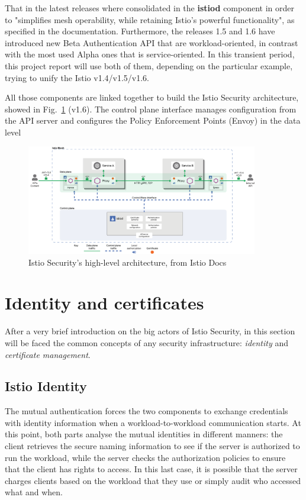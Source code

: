 That in the latest releases where consolidated in the \textbf{istiod} component in order to "simplifies mesh operability, while retaining Istio’s powerful functionality", as specified in the documentation. Furthermore, the releases 1.5 and 1.6 have introduced new Beta Authentication API that are workload-oriented, in contrast with the most used Alpha ones that is service-oriented. In this transient period, this project report will use both of them, depending on the particular example, trying to unify the Istio v1.4/v1.5/v1.6.

All those components are linked together to build the Istio Security architecture, showed in Fig.~\ref{fig:hlarch} (v1.6). The control plane interface manages configuration from the API server and configures the Policy Enforcement Points (Envoy) in the data level

\begin{figure}
    \centering
    \includegraphics[width=0.9\textwidth]{chapters/images/chp1/arch-sec.png}
    \caption{Istio Security's high-level architecture, from Istio Docs}
    \label{fig:hlarch}
\end{figure}

\section{Identity and certificates}
After a very brief introduction on the big actors of Istio Security, in this section will be faced the common concepts of any security infrastructure: \textit{identity} and \textit{certificate management}.

\subsection{Istio Identity}
The mutual authentication forces the two components to exchange credentials with identity information when a workload-to-workload communication starts. At this point, both parts analyse the mutual identities in different manners: the client retrieves the secure naming information to see if the server is authorized to run the workload, while the server checks the authorization policies to ensure that the client has rights to access. 
In this last case, it is possible that the server charges clients based on the workload that they use or simply audit who accessed what and when.

